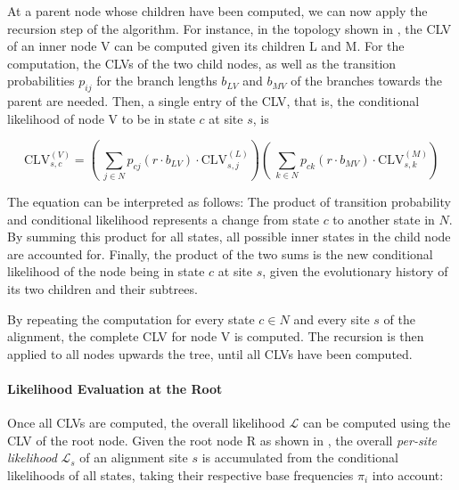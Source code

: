 At a parent node whose children have been computed, we can now apply the recursion step of the algorithm.
For instance, in the topology shown in , the CLV of an inner node {\sffamily V}
can be computed given its children {\sffamily L} and {\sffamily M}.
For the computation, the CLVs of the two child nodes,
as well as the transition probabilities $p_{ij}$ for the branch lengths $b_{LV}$ and $b_{MV}$
of the branches towards the parent are needed.
Then, a single entry of the CLV, that is,
the conditional likelihood of node {\sffamily V} to be in state $c$ at site $s$, is

\begin{equation}
    \label{ch:Foundations:sec:MLTreeInference:eq:CLV}
    \mbox{CLV}^{(V)}_{s,c} =
    \left(~ \sum_{j \in N} p_{cj}(r \cdot b_{LV}) \cdot \mbox{CLV}^{(L)}_{s,j} \right)
    \left(~ \sum_{k \in N} p_{ck}(r \cdot b_{MV}) \cdot \mbox{CLV}^{(M)}_{s,k} \right)
\end{equation}

The equation can be interpreted as follows:
The product of transition probability and conditional likelihood represents a change from state $c$ to another state in $N$.
By summing this product for all states, all possible inner states in the child node are accounted for.
Finally, the product of the two sums is the new conditional likelihood of the node being in state $c$ at site $s$,
given the evolutionary history of its two children and their subtrees.

By repeating the computation for every state $c \in N$ and every site $s$ of the alignment,
the complete CLV for node {\sffamily V} is computed.
The recursion is then applied to all nodes upwards the tree, until all CLVs have been computed.

\paragraph{Likelihood Evaluation at the Root}
\label{ch:Foundations:sec:MLTreeInference:sub:LikelihoodComputations:par:RootLikelihood}

Once all CLVs are computed, the overall likelihood $\mathcal{L}$ can be computed using the CLV of the root node.
Given the root node {\sffamily R} as shown in ,
the overall \emph{per-site likelihood} $\mathcal{L}_s$ of an alignment site $s$ is
accumulated from the conditional likelihoods of all states,
taking their respective base frequencies $\pi_i$ into account:

